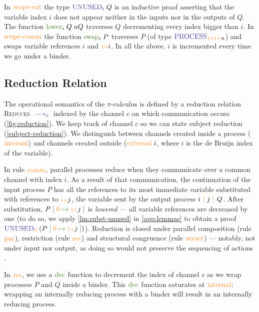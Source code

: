 \documentclass[a4paper,UKenglish,cleveref,autoref,thm-restate,authorcolumns]{lipics-v2019}
\theoremstyle{definition}
\newcommand{\picalc}{$\pi$-calculus}
\newcommand{\type}[1]{\textcolor{BlueViolet}{\operatorname{#1}}}
\newcommand{\constr}[1]{\textcolor{BurntOrange}{\operatorname{#1}}}
\newcommand{\func}[1]{\textcolor{OliveGreen}{\operatorname{#1}}}
\newcommand{\send}[2]{#1 \; \constr{\langle} \; #2 \;\constr{\rangle} \;}
\newcommand{\suc}{\constr{\scriptstyle 1+}}
\newcommand{\subst}[3]{#1 \; \func{[} \; #3 \; \func{\mapsto} \;#2 \; \func{]}}
\newcommand{\reduce}[1]{\; \type{\longrightarrow}_{#1} \;}
\newcommand{\Process}{\type{PROCESS}}
\newcommand{\Unused}{\type{UNUSED}}
\begin{document}
In $\constr{scope-ext}$ the type $\Unused_i \; Q$ is an inductive proof asserting that the variable index $i$ does not appear neither in the inputs nor in the outputs of $Q$.
The function $\func{lower}_i \; Q \; uQ$ traverses $Q$ decrementing every index bigger than $i$.
In $\constr{scope-comm}$ the function $\func{swap}_i \; P$ traverses $P$ (of type $\Process_{\suc \suc n}$) and swaps variable references $i$ and $\suc i$.
In all the above, $i$ is incremented every time we go under a binder.
  
\subsection{Reduction Relation}
\label{operational-semantics}

The operational semantics of the \picalc{} is defined by a reduction relation \textsc{Reduces} $\reduce{c}$ indexed by the channel $c$ on which communication occurs (\autoref{fig:reduction}).
We keep track of channel $c$ so we can state subject reduction (\autoref{subject-reduction}).
We distinguish between channels created inside a process ($\constr{internal}$) and channels created outside ($\constr{external}\ i$, where $i$ is the de Bruijn index of the variable).

In rule $\constr{comm}$, parallel processes reduce when they communicate over a common channel with index ${i}$.
As a result of that communication, the continuation of the input process $P$ has all the references to its most immediate variable substituted with references to $\suc j$, the variable sent by the output process $\send{i}{j}{Q}$.
After substitution, $\subst{P}{\suc j}{\constr{0}}$ is \emph{lowered} --- all variable references are decreased by one (to do so, we apply \autoref{lm:subst-unused} in \autoref{app:lemmas} to obtain a proof $\Unused_{\constr{0}} \; (\subst{P}{\suc j}{\constr{0}})$).
Reduction is closed under parallel composition (rule $\constr{par}$), restriction (rule $\constr{res}$) and structural congruence (rule $\constr{struct}$) 
--- notably, not under input nor output, as doing so would not preserve the sequencing of actions \cite{Sangio01}.


In $\constr{res}$, we use a $\func{dec}$ function to decrement the index of channel $c$ as we wrap processes $P$ and $Q$ inside a binder.
This $\func{dec}$ function saturates at $\constr{internal}$: wrapping an internally reducing process with a binder will result in an internally reducing process.
\end{document}
